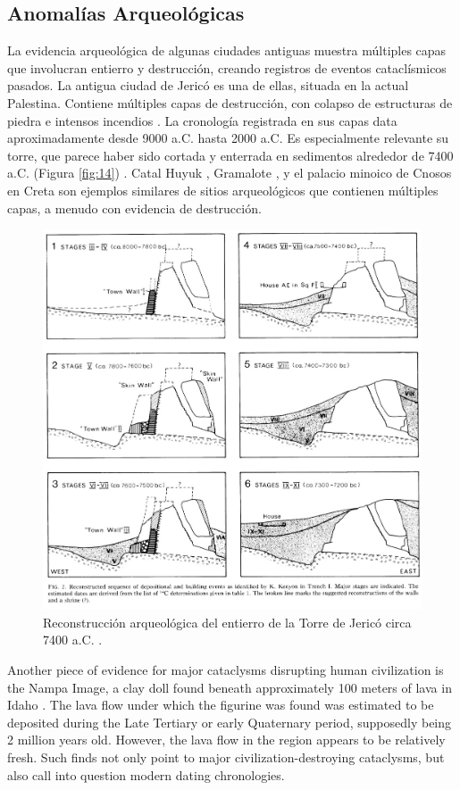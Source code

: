 \documentclass[10pt,twocolumn,letterpaper]{article}
\begin{document}
\subsection{Anomalías Arqueológicas}

La evidencia arqueológica de algunas ciudades antiguas muestra múltiples capas que involucran entierro y destrucción, creando registros de eventos cataclísmicos pasados. La antigua ciudad de Jericó es una de ellas, situada en la actual Palestina. Contiene múltiples capas de destrucción, con colapso de estructuras de piedra e intensos incendios \cite{96,97}. La cronología registrada en sus capas data aproximadamente desde 9000 a.C. hasta 2000 a.C. Es especialmente relevante su torre, que parece haber sido cortada y enterrada en sedimentos alrededor de 7400 a.C. (Figura \ref{fig:14}) \cite{95}. Catal Huyuk \cite{99}, Gramalote \cite{98}, y el palacio minoico de Cnosos en Creta \cite{100,101} son ejemplos similares de sitios arqueológicos que contienen múltiples capas, a menudo con evidencia de destrucción.

\begin{figure}[t]
\begin{center}
   \includegraphics[width=1\linewidth]{jericho.jpg}
\end{center}
   \caption{Reconstrucción arqueológica del entierro de la Torre de Jericó circa 7400 a.C. \cite{95}.}
\label{fig:14}
\label{fig:onecol}
\end{figure}
Another piece of evidence for major cataclysms disrupting human civilization is the Nampa Image, a clay doll found beneath approximately 100 meters of lava in Idaho \cite{102,103}. The lava flow under which the figurine was found was estimated to be deposited during the Late Tertiary or early Quaternary period, supposedly being 2 million years old. However, the lava flow in the region appears to be relatively fresh. Such finds not only point to major civilization-destroying cataclysms, but also call into question modern dating chronologies.
\end{document}
